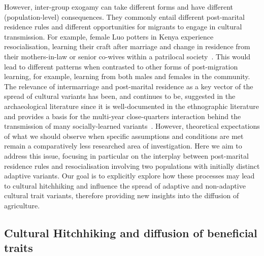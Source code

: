 \documentclass[9pt,twocolumn,twoside,lineno]{pnas-new}
\begin{document}
However, inter-group exogamy can take different forms and have different (population-level) consequences. 
They commonly entail different post-marital residence rules and different opportunities for migrants to engage in cultural transmission.
%
For example, female Luo potters in Kenya experience resocialisation, learning their craft after marriage and change in residence from their mothers-in-law or senior co-wives within a patrilocal society~\citep{herbich_long_2008}. 
This would lead to different patterns when contrasted to other forms of post-migration learning, for example, learning from both males and females in the community. %
The relevance of intermarriage and post-marital residence as a key vector of the spread of cultural variants has been, and continues to be, suggested in the archaeological literature since it is well-documented in the ethnographic literature and provides a basis for the multi-year close-quarters interaction behind the transmission of many socially-learned variants~\citep{kohler_how_2013,sanger_post-marital_2020,mills_intermarriage_2018,lycett_spatially_2020, roux_ethnoarchaeology_2007}. 
{\color{red}However, theoretical expectations of what we should observe when specific assumptions and conditions are met remain a comparatively less researched area of investigation. Here we aim to address this issue, focusing in particular on the interplay between post-marital residence rules and resocialisation involving two populations with initially distinct adaptive variants. 
Our goal is to explicitly explore how these processes may lead to cultural hitchhiking and influence the spread of adaptive and non-adaptive cultural trait variants, therefore providing new insights into the diffusion of agriculture.}

\subsection*{Cultural Hitchhiking and diffusion of beneficial traits}
\end{document}
